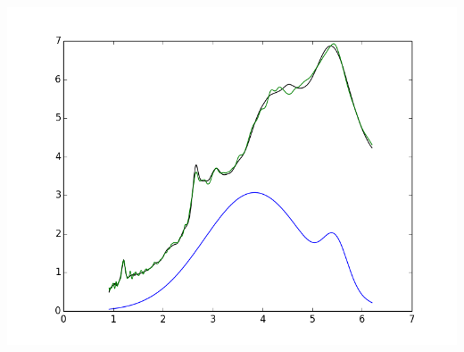 \documentclass{article}
\begin{document}
\includegraphics{"normSep184-2-p5SDS-1xdil.asc.png"}
\end{document}
